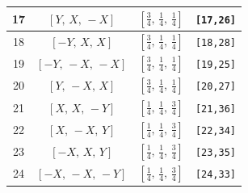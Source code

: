 \documentclass[fleqn,8pt]{jsarticle}
\begin{document}
\begin{longtable}{cccc}
17 & $\left[ Y,\, X,\, - X \right]$ & $\left[ \frac{3}{4},\, \frac{1}{4},\, \frac{1}{4} \right]$ & {\tt [17,26]} \\ \hline
18 & $\left[ - Y,\, X,\, X \right]$ & $\left[ \frac{3}{4},\, \frac{1}{4},\, \frac{1}{4} \right]$ & {\tt [18,28]} \\ \hline
19 & $\left[ - Y,\, - X,\, - X \right]$ & $\left[ \frac{3}{4},\, \frac{1}{4},\, \frac{1}{4} \right]$ & {\tt [19,25]} \\ \hline
20 & $\left[ Y,\, - X,\, X \right]$ & $\left[ \frac{3}{4},\, \frac{1}{4},\, \frac{1}{4} \right]$ & {\tt [20,27]} \\ \hline
21 & $\left[ X,\, X,\, - Y \right]$ & $\left[ \frac{1}{4},\, \frac{1}{4},\, \frac{3}{4} \right]$ & {\tt [21,36]} \\ \hline
22 & $\left[ X,\, - X,\, Y \right]$ & $\left[ \frac{1}{4},\, \frac{1}{4},\, \frac{3}{4} \right]$ & {\tt [22,34]} \\ \hline
23 & $\left[ - X,\, X,\, Y \right]$ & $\left[ \frac{1}{4},\, \frac{1}{4},\, \frac{3}{4} \right]$ & {\tt [23,35]} \\ \hline
24 & $\left[ - X,\, - X,\, - Y \right]$ & $\left[ \frac{1}{4},\, \frac{1}{4},\, \frac{3}{4} \right]$ & {\tt [24,33]} \\
\end{longtable}
\renewcommand{\arraystretch}{1.2}
\end{document}
